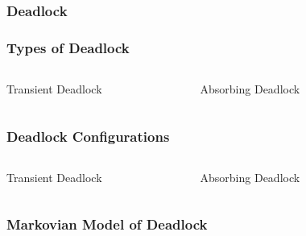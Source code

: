 \documentclass[xcolor={table}]{beamer}
\begin{document}

\begin{frame}
    \frametitle{Deadlock}
    \begin{figure}
    
    \end{figure}
\end{frame}

\begin{frame}
    \begin{figure}
    
    \end{figure}
\end{frame}

\begin{frame}
    \frametitle{Types of Deadlock}
    \begin{columns}
        \center
        Transient Deadlock
        \begin{figure}
        
        \end{figure}
        \center
        Absorbing Deadlock
        \begin{figure}
        
        \end{figure}
    \end{columns}
\end{frame}

\begin{frame}
    \frametitle{Deadlock Configurations}
    \begin{columns}
        \center
        Transient Deadlock
        \begin{figure}
        
        \end{figure}
        \center
        Absorbing Deadlock
        \begin{figure}
        
        \end{figure}
    \end{columns}
\end{frame}


\begin{frame}
    \frametitle{Markovian Model of Deadlock}
    \newline
\end{frame}
\end{document}
